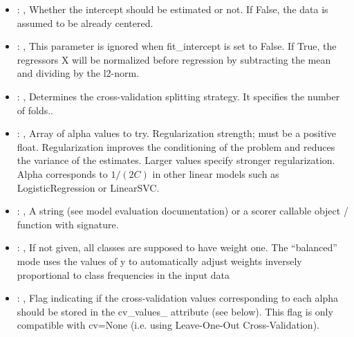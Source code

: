 \begin{itemize}
    \item {}: , 
      Whether the intercept should be estimated or not. If False,
      the data is assumed to be already centered.

    \item {}: , 
      This parameter is ignored when fit\_intercept is set to False. If True, the
      regressors X will be normalized before regression by subtracting the mean and dividing
      by the l2-norm.

    \item {}: , 
      Determines the cross-validation splitting strategy.
      It specifies the number of folds..

    \item {}: , 
      Array of alpha values to try. Regularization strength; must be a positive float.
      Regularization                                                  improves the conditioning of
      the problem and reduces the variance of the estimates.
      Larger values specify stronger regularization. Alpha corresponds to $1 / (2C)$ in other
      linear models such as LogisticRegression or LinearSVC.

    \item {}: , 
      A string (see model evaluation documentation) or a scorer
      callable object / function with signature.

    \item {}: \xmlDesc{[balanced]}, 
      If not given, all classes are supposed to have weight one.
      The “balanced” mode uses the values of y to automatically adjust weights
      inversely proportional to class frequencies in the input data

    \item {}: , 
      Flag indicating if the cross-validation values corresponding
      to each alpha should be stored in the cv\_values\_ attribute (see below).
      This flag is only compatible with cv=None (i.e. using Leave-One-Out
      Cross-Validation).
  \end{itemize}


